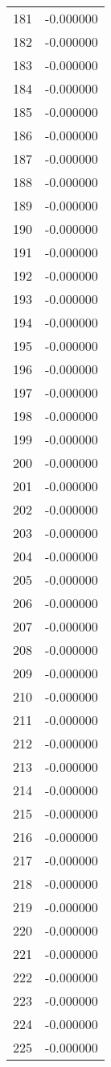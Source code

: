 \documentclass[12pt]{article}
\begin{document}
\begin{longtable}{@{}cc@{}}
181 & -0.000000 \\
182 & -0.000000 \\
183 & -0.000000 \\
184 & -0.000000 \\
185 & -0.000000 \\
186 & -0.000000 \\
187 & -0.000000 \\
188 & -0.000000 \\
189 & -0.000000 \\
190 & -0.000000 \\
191 & -0.000000 \\
192 & -0.000000 \\
193 & -0.000000 \\
194 & -0.000000 \\
195 & -0.000000 \\
196 & -0.000000 \\
197 & -0.000000 \\
198 & -0.000000 \\
199 & -0.000000 \\
200 & -0.000000 \\
201 & -0.000000 \\
202 & -0.000000 \\
203 & -0.000000 \\
204 & -0.000000 \\
205 & -0.000000 \\
206 & -0.000000 \\
207 & -0.000000 \\
208 & -0.000000 \\
209 & -0.000000 \\
210 & -0.000000 \\
211 & -0.000000 \\
212 & -0.000000 \\
213 & -0.000000 \\
214 & -0.000000 \\
215 & -0.000000 \\
216 & -0.000000 \\
217 & -0.000000 \\
218 & -0.000000 \\
219 & -0.000000 \\
220 & -0.000000 \\
221 & -0.000000 \\
222 & -0.000000 \\
223 & -0.000000 \\
224 & -0.000000 \\
225 & -0.000000 \\

\end{longtable}
\end{document}
